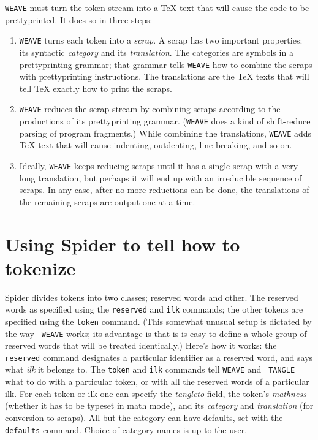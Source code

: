 {\tt WEAVE} must turn the token stream into a {\TeX} text that will
cause the code to be prettyprinted.
It does so in three steps:
\begin{enumerate}
\item 
{\tt WEAVE} turns each token into a {\em scrap}.
A scrap has two important properties: its syntactic 
{\em category} and its {\em translation}.
The categories are symbols in a prettyprinting grammar; that grammar
tells {\tt WEAVE} how to combine the scraps
with prettyprinting instructions.
The translations are the {\TeX} texts that will tell {\TeX} exactly
how to print the scraps.
\item
{\tt WEAVE} reduces the scrap stream by combining scraps according to
the productions of its prettyprinting grammar.
({\tt WEAVE} does a kind of shift-reduce parsing of program fragments.)
While combining the translations, {\tt WEAVE} adds {\TeX} text that
will cause indenting, outdenting, line breaking, and so on.
\item
Ideally, {\tt WEAVE} keeps reducing scraps until it has a single scrap with
a very long translation, but perhaps it will end up
with an irreducible sequence of scraps.
In any case, after no more reductions can be done, the translations of the
remaining scraps are output one at a time.
\end{enumerate}

\section{Using {Spider} to tell {\WEB} how to tokenize}
{Spider} divides tokens into two classes; reserved words and
other.
The reserved words as specified using the {\tt reserved} and {\tt ilk}
commands; the other tokens are specified using the {\tt token}
command.
(This somewhat unusual setup is dictated by the way {\tt
WEAVE} works; its advantage is that is is easy to define a whole group
of reserved words that will be treated identically.)
Here's how it works: the {\tt reserved} command designates
 a particular identifier as a reserved word, and says
what {\em ilk} it belongs to.
The {\tt token} and {\tt ilk} commands tell {\tt WEAVE} and {\tt
TANGLE} what to do with a particular token, or with all the reserved
words of a particular ilk.
For each token or ilk one can specify the {\em tangleto} field, the
token's {\em mathness} (whether it has to be typeset in math mode), and
its {\em category} and {\em translation} (for conversion to scraps).
All but the category can have defaults, set with the {\tt defaults}
command.
Choice of category names is up to the user.


